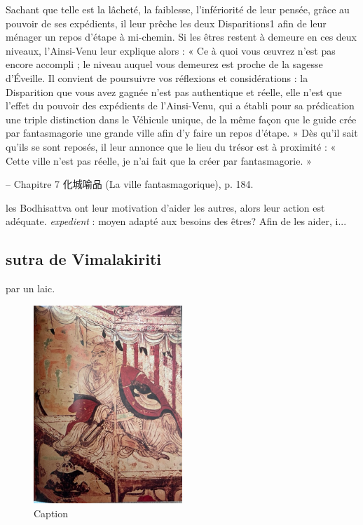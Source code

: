 \begin{singlequote}
Sachant que telle est la lâcheté, la faiblesse, l’infériorité de leur pensée, grâce au pouvoir de ses expédients, il leur prêche les deux Disparitions1 afin de leur ménager un repos d’étape à mi-chemin. Si les êtres restent à demeure en ces deux niveaux, l’Ainsi-Venu leur explique alors :
« Ce à quoi vous œuvrez n’est pas encore accompli ; le niveau auquel vous demeurez est proche de la sagesse d’Éveille. Il convient de poursuivre vos réflexions et considérations : la Disparition que vous avez gagnée n’est pas authentique et réelle, elle n’est que l’effet du pouvoir des expédients de l’Ainsi-Venu, qui a établi pour sa prédication une triple distinction dans le Véhicule unique, de la même façon que le guide crée par fantasmagorie une grande ville afin d’y faire un repos d’étape. » Dès qu’il sait qu’ils se sont reposés, il leur annonce que le lieu du trésor est à proximité : « Cette ville n’est pas réelle, je n’ai fait que la créer par fantasmagorie. »

-- Chapitre 7 化城喻品 (La ville fantasmagorique), p. 184.
\end{singlequote}

\begin{Ex}
    les Bodhisattva ont leur motivation d'aider les autres, alors leur action est adéquate. \textit{expedient} : moyen adapté aux besoins des êtres? Afin de les aider, i...
\end{Ex}

\subsection{sutra de Vimalakiriti} par un laic.
\begin{figure}
    \centering
        \caption{Caption}
        \includegraphics[width=0.5\textwidth]{ConfucianismeTaoismeBouddhismeChinois/BouddhaMahayana.jpg}

    \label{fig:enter-label}
\end{figure}


